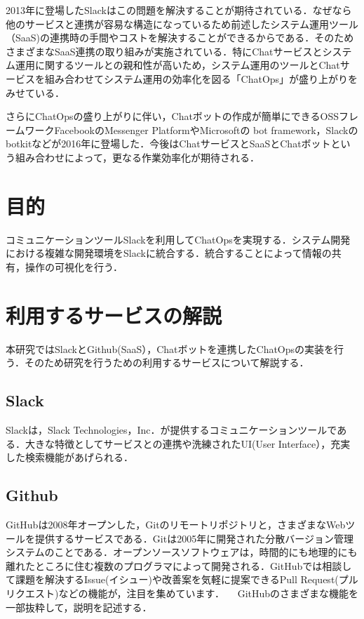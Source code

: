 2013年に登場したSlackはこの問題を解決することが期待されている．なぜなら他のサービスと連携が容易な構造になっているため\cite{slack}前述したシステム運用ツール（SaaS)の連携時の手間やコストを解決することができるからである．そのためさまざまなSaaS連携の取り組みが実施されている．特にChatサービスとシステム運用に関するツールとの親和性が高いため，システム運用のツールとChatサービスを組み合わせてシステム運用の効率化を図る「ChatOps」が盛り上がりをみせている．

さらにChatOpsの盛り上がりに伴い，Chatボットの作成が簡単にできるOSSフレームワークFacebookのMessenger PlatformやMicrosoftの bot framework，Slackのbotkitなどが2016年に登場した．今後はChatサービスとSaaSとChatボットという組み合わせによって，更なる作業効率化が期待される．






\chapter{目的}
コミュニケーションツールSlackを利用してChatOpsを実現する．システム開発における複雑な開発環境をSlackに統合する．統合することによって情報の共有，操作の可視化を行う．


\chapter{利用するサービスの解説}
本研究ではSlackとGithub(SaaS），Chatボットを連携したChatOpsの実装を行う．そのため研究を行うための利用するサービスについて解説する．

\section{Slack}
Slackは，Slack Technologies，Inc．が提供するコミュニケーションツールである．大きな特徴としてサービスとの連携や洗練されたUI(User Interface），充実した検索機能があげられる．

\section{Github}

GitHubは2008年オープンした，Gitのリモートリポジトリと，さまざまなWebツールを提供するサービスである．Gitは2005年に開発された分散バージョン管理システムのことである．オープンソースソフトウェアは，時間的にも地理的にも離れたところに住む複数のプログラマによって開発される．GitHubでは相談して課題を解決するIssue(イシュー)や改善案を気軽に提案できるPull Request(プルリクエスト)などの機能が，注目を集めています．
　GitHubのさまざまな機能を一部抜粋して，説明を記述する．


